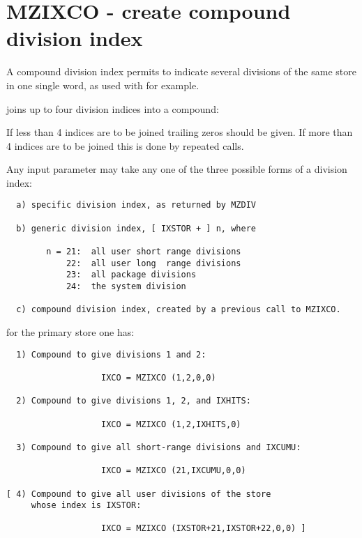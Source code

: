 \section{MZIXCO - create compound division index}
\label{sec:MZIXCO}

A compound division index permits to indicate several divisions
of the same store in one single word,
as used with  for example.

 joins up to four division indices into a compound:


If less than 4 indices are to be joined trailing zeros
should be given.
If more than 4 indices are to be joined this is done by
repeated calls.

Any input parameter  may take any one of the three possible
forms of a division index:
\begin{verbatim}
  a) specific division index, as returned by MZDIV

  b) generic division index, [ IXSTOR + ] n, where

        n = 21:  all user short range divisions
            22:  all user long  range divisions
            23:  all package divisions
            24:  the system division

  c) compound division index, created by a previous call to MZIXCO.

\end{verbatim} 

\Examples

for the primary store one has:

\begin{verbatim}
  1) Compound to give divisions 1 and 2:

                   IXCO = MZIXCO (1,2,0,0)

  2) Compound to give divisions 1, 2, and IXHITS:

                   IXCO = MZIXCO (1,2,IXHITS,0)

  3) Compound to give all short-range divisions and IXCUMU:

                   IXCO = MZIXCO (21,IXCUMU,0,0)

[ 4) Compound to give all user divisions of the store
     whose index is IXSTOR:

                   IXCO = MZIXCO (IXSTOR+21,IXSTOR+22,0,0) ]
\end{verbatim} 

